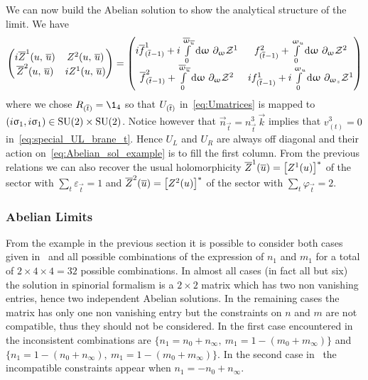 We can now build the Abelian solution to show the analytical structure of the limit.
We have
\begin{equation}
  \mqty( i \barZ^1( u,\, \baru ) & Z^2( u,\, \baru )
         \\
         \barZ^2( u,\, \baru ) & i Z^1( u,\, \baru )
  )
  =
  \mqty( i \barf^1_{(\bart - 1)} + i \finiteint{\omega}{0}{\bomega_{\baru}}\, \ipd{\omega} \cZ^1
         &
         f^2_{(\bart -1)} + \finiteint{\omega}{0}{\omega_u}\, \ipd{\omega} \cZ^2
         \\
         \barf^2_{(\bart - 1)} + \finiteint{\omega}{0}{\bomega_{\baru}}\, \ipd{\omega} \cZ^2
         &
         i f^1_{(\bart-1)} + i \finiteint{\omega}{0}{\omega_u}\, \ipd{\omega_z} \cZ^1
  )
\end{equation}
where we chose $R_{(\bart)} = \1_4$ so that $U_{(\overline{t})}$ in~\eqref{eq:Umatrices} is mapped to $(i \upsigma_1, i \upsigma_1) \in \mathrm{SU}(2) \times \mathrm{SU}(2)$.
Notice however that $\vec{n}_{\vec{t}} = n_{\vec{t}}^3\, \vec{k}$ implies that $v^3_{(t)} = 0$ in~\eqref{eq:special_UL_brane_t}.
Hence $U_L$ and $U_R$ are always off diagonal and their action on~\eqref{eq:Abelian_sol_example} is to fill the first column.
From the previous relations we can also recover the usual holomorphicity $\overline{Z}^1(\overline{u}) = \qty[ Z^1(u) ]^*$ of the sector with $\sum\limits_t \varepsilon_{\vec{t}} = 1$ and $\overline{Z}^2(\overline{u}) = \qty[ Z^2(u) ]^*$ of the sector with $\sum\limits_t \varphi_{\vec{t}} = 2$.


\subsubsection{Abelian Limits}

From the example in the previous section it is possible to consider both cases given in~ and all possible combinations of the expression of $n_{1}$ and $m_{1}$ for a total of $2 \times 4 \times 4 = 32$ possible combinations.
In almost all cases (in fact all but six) the solution in spinorial formalism is a $2 \times 2$ matrix which has two non vanishing entries, hence two independent Abelian solutions.
In the remaining cases the matrix has only one non vanishing entry but the constraints on $n$ and $m$ are not compatible, thus they should not be considered.
In the first case encountered in~ the inconsistent combinations are $\{ n_{1} = n_{0} + n_{\infty},~ m_{1} = 1 - (m_{0} + m_{\infty}) \}$ and $\{ n_{1} = 1 - (n_{0} + n_{\infty}),~ m_{1} = 1 - (m_{0} + m_{\infty}) \}$.
In the second case in~ the incompatible constraints appear when $n_{1} = -n_{0} + n_{\infty}$.


